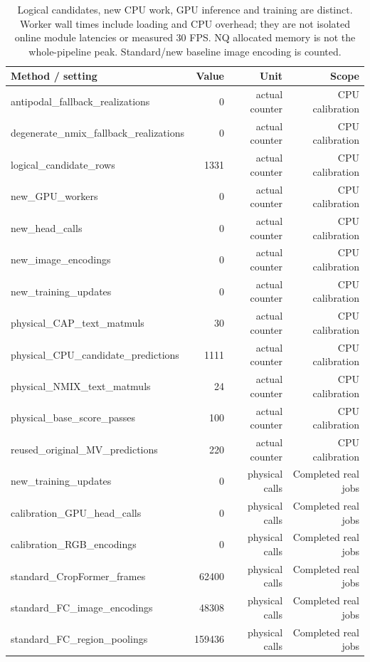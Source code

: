 \begin{table}[t]
\centering
\small
\caption{Logical candidates, new CPU work, GPU inference and training are distinct. Worker wall times include loading and CPU overhead; they are not isolated online module latencies or measured 30 FPS. NQ allocated memory is not the whole-pipeline peak. Standard/new baseline image encoding is counted.}
\label{tab:benchmark-s8}
\begin{tabular}{lrrr}
\toprule
Method / setting & Value & Unit & Scope \\
\midrule
antipodal\_fallback\_realizations & 0 & actual counter & CPU calibration \\
degenerate\_nmix\_fallback\_realizations & 0 & actual counter & CPU calibration \\
logical\_candidate\_rows & 1331 & actual counter & CPU calibration \\
new\_GPU\_workers & 0 & actual counter & CPU calibration \\
new\_head\_calls & 0 & actual counter & CPU calibration \\
new\_image\_encodings & 0 & actual counter & CPU calibration \\
new\_training\_updates & 0 & actual counter & CPU calibration \\
physical\_CAP\_text\_matmuls & 30 & actual counter & CPU calibration \\
physical\_CPU\_candidate\_predictions & 1111 & actual counter & CPU calibration \\
physical\_NMIX\_text\_matmuls & 24 & actual counter & CPU calibration \\
physical\_base\_score\_passes & 100 & actual counter & CPU calibration \\
reused\_original\_MV\_predictions & 220 & actual counter & CPU calibration \\
new\_training\_updates & 0 & physical calls & Completed real jobs \\
calibration\_GPU\_head\_calls & 0 & physical calls & Completed real jobs \\
calibration\_RGB\_encodings & 0 & physical calls & Completed real jobs \\
standard\_CropFormer\_frames & 62400 & physical calls & Completed real jobs \\
standard\_FC\_image\_encodings & 48308 & physical calls & Completed real jobs \\
standard\_FC\_region\_poolings & 159436 & physical calls & Completed real jobs \\

\end{tabular}
\end{table}
